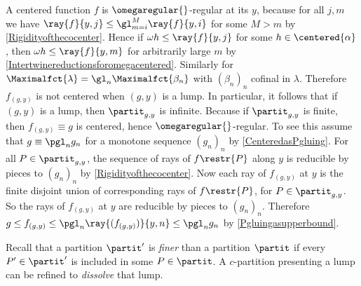 \begin{remark}
A centered function $f$ is $\omegaregular{}$-regular at its \cocenter{} $y$, because for all $j,m$ we have $\ray{f}{y,j}\leq \gl_{m=i}^M\ray{f}{y,i}$ for some $M>m$ by \cref{Rigidityofthecocenter}. Hence if $\omega h\leq \ray{f}{y,j}$ for some $h\in \centered{\alpha}$, then $\omega h\leq \ray{f}{y,m}$ for arbitrarily large $m$ by \cref{Intertwinereductionsforomegacentered}. {Similarly for $\Maximalfct{\lambda}=\gl_n \Maximalfct{\beta_n}$ with $(\beta_n)_n$ cofinal in $\lambda$. } Therefore $f_{(g,y)}$ is not centered when $(g,y)$ is a lump.
In particular, it follows that if $(g,y)$ is a lump, then $\partit_{g,y}$ is infinite. {Because if $\partit_{g,y}$ is finite, then $f_{(g,y)}\equiv g$ is centered, hence $\omegaregular{}$-regular. To see this assume that $g\equiv \pgl_n g_n$ for a monotone sequence $(g_n)_n$ by \cref{CenteredasPgluing}. For all $P\in \partit_{g,y}$, the sequence of rays of $f\restr{P}$ along $y$ is reducible by pieces to $(g_n)_n$ by \cref{Rigidityofthecocenter}. Now each ray of $f_{(g,y)}$ at $y$ is the finite disjoint union of corresponding rays of $f\restr{P}$, for $P\in \partit_{g,y}$. So the rays of $f_{(g,y)}$ at $y$ are reducible by pieces to $(g_n)_n$. Therefore $g\leq f_{(g,y)}\leq \pgl_n \ray{(f_{(g,y)})}{y,n} \leq \pgl_n g_n$ by \cref{Pgluingasupperbound}.}
\end{remark}

Recall that a partition $\partit'$ is \emph{finer} than a partition $\partit$ if every $P'\in\partit'$ is included in some $P\in\partit$.
A $c$-partition presenting a lump can be refined to \emph{dissolve} that lump.


